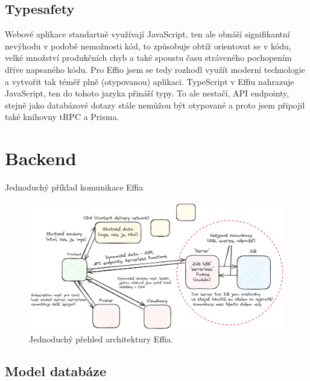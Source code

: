 \documentclass[12pt, a4paper,
openright
]{report}
\begin{document}
\section{Typesafety}

Webové aplikace standartně využívají JavaScript, ten ale obnáší signifikantní nevýhodu v podobě nemožnosti  kód, to způsobuje obtíž orientovat se v kódu, velké množství produkčních chyb a také spoustu času stráveného pochopením dříve napsaného kódu. Pro Effio jsem se tedy rozhodl využít moderní technologie a vytvořit tak téměř plně  (otypovanou) aplikaci. TypeScript v Effiu nahrazuje JavaScript, ten do tohoto jazyka přináší typy. To ale nestačí, API endpointy, stejně jako databázové dotazy stále nemůžou být otypované a proto jsem připojil také knihovny tRPC a Prisma.


\chapter{Backend}

Jednoduchý příklad komunikace  Effia
\begin{figure}[h!]
	\centering %
	\includegraphics[width=1\linewidth]{image/effio-architecture-simple.png} 
	\caption{Jednoduchý přehled architektury Effia.} %
	\label{fig:effio-architecture} %
\end{figure}

\clearpage
\section{Model databáze}
\end{document}
